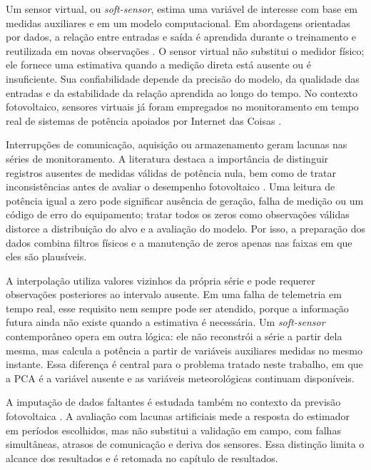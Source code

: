 Um sensor virtual, ou \textit{soft-sensor}, estima uma variável de
interesse com base em medidas auxiliares e em um modelo computacional.
Em abordagens orientadas por dados, a relação entre entradas e saída é
aprendida durante o treinamento e reutilizada em novas observações
\cite{kadlec2009}. O sensor virtual não substitui o medidor físico; ele
fornece uma estimativa quando a medição direta está ausente ou é
insuficiente. Sua confiabilidade depende da precisão do modelo, da
qualidade das entradas e da estabilidade da relação aprendida ao longo
do tempo. No contexto fotovoltaico, sensores virtuais já foram
empregados no monitoramento em tempo real de sistemas de potência
apoiados por Internet das Coisas \cite{boubakr2022monitoramento}.

Interrupções de comunicação, aquisição ou armazenamento geram lacunas nas
séries de monitoramento. A literatura destaca a importância de distinguir
registros ausentes de medidas válidas de potência nula, bem como de tratar
inconsistências antes de avaliar o desempenho fotovoltaico
\cite{lindig2020monitoramento,livera2020qualidade}. Uma leitura de potência
igual a zero pode significar ausência de geração, falha de medição ou um
código de erro do equipamento; tratar todos os zeros como observações
válidas distorce a distribuição do alvo e a avaliação do modelo. Por isso, a
preparação dos dados combina filtros físicos e a manutenção de zeros apenas
nas faixas em que eles são plausíveis.

A interpolação utiliza valores vizinhos da própria série e pode
requerer observações posteriores ao intervalo ausente. Em uma falha de
telemetria em tempo real, esse requisito nem sempre pode ser atendido,
porque a informação futura ainda não existe quando a estimativa é
necessária. Um \textit{soft-sensor} contemporâneo opera em outra lógica:
ele não reconstrói a série a partir dela mesma, mas calcula a potência a
partir de variáveis auxiliares medidas no mesmo instante. Essa diferença
é central para o problema tratado neste trabalho, em que a PCA é a
variável ausente e as variáveis meteorológicas continuam disponíveis.

A imputação de dados faltantes é estudada também no contexto da previsão
fotovoltaica \cite{lee2024}. 
A avaliação com lacunas artificiais mede a resposta do
estimador em períodos escolhidos, mas não substitui a validação em campo,
com falhas simultâneas, atrasos de comunicação e deriva dos sensores.
Essa distinção limita o alcance dos resultados e é retomada no capítulo
de resultados.

